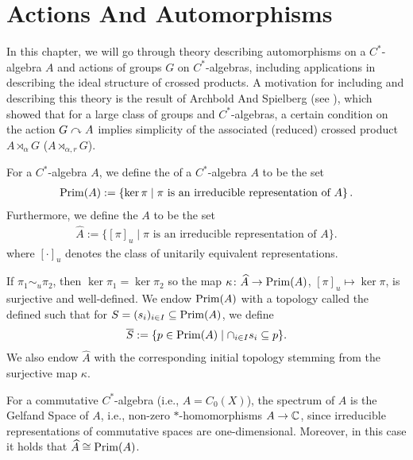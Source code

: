 \chapter{Actions And Automorphisms}
In this chapter, we will go through theory describing automorphisms on a $C^*$-algebra $A$ and actions of groups $G$ on $C^*$-algebras, including applications in describing the ideal structure of crossed products. A motivation for including and describing this theory is the result of Archbold And Spielberg (see \cite{archbold1994topologically}), which showed that for a large class of groups and $C^*$-algebras, a certain condition on the action $G \stackrel{}{\curvearrowright} A$ implies simplicity of the associated (reduced) crossed product $A \rtimes_\alpha G$ ($A \rtimes_{\alpha,r} G$).
\begin{definition}
	For a $C^*$-algebra $A$, we define the  of a $C^*$-algebra $A$ to be the set
	\begin{align*}
		\mathrm{Prim}(A) := \left\{ \ker \pi \mid \pi \text{ is an irreducible representation of } A \right\}.
	\end{align*}
	Furthermore, we define the  $A$ to be the set
	\begin{align*}
		\hat A := \{[\pi]_u \mid \pi \text{ is an irreducible representation of } A \}.
	\end{align*}
where $[\cdot]_u$ denotes the class of unitarily equivalent representations.

If $\pi_1 \sim_u \pi_2$, then $\ker \pi_1 = \ker \pi_2$ so the map $\kappa \colon \widehat{A} \to \mathrm{Prim}(A)$, $[\pi]_u \mapsto \ker \pi$, is surjective and well-defined. We endow $\mathrm{Prim}(A)$ with a topology called the  defined such that for $S = (s_i)_{i \in I} \subseteq \mathrm{Prim}(A)$, we define
\begin{align*}
	\overline S := \{ p \in \mathrm{Prim}(A) \mid \cap_{i \in I} s_i \subseteq p\}.
\end{align*}
We also endow $\hat A$ with the corresponding initial topology stemming from the surjective map $\kappa$.
\end{definition}
\begin{remark}
	For a commutative $C^*$-algebra (i.e., $A = C_0(X)$), the spectrum of $A$ is the Gelfand Space of $A$, i.e., non-zero $*$-homomorphisms $A \to \mathbb{C}$, since irreducible representations of commutative spaces are one-dimensional. Moreover, in this case it holds that $\widehat{A} \cong \mathrm{Prim}(A)$.
\end{remark}
